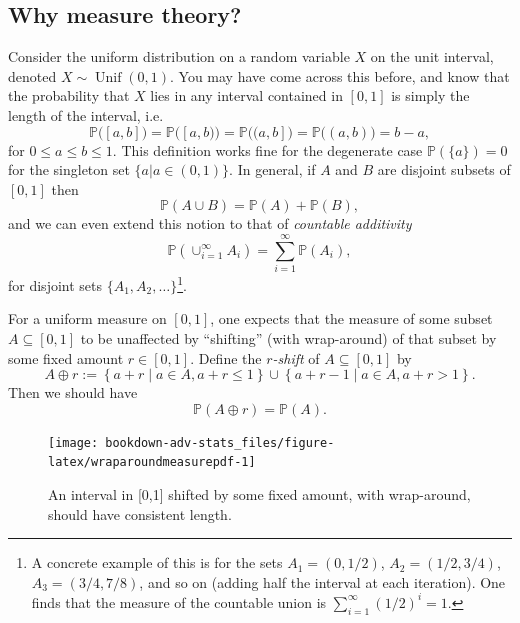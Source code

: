 \documentclass[
]{book}
\DeclareMathOperator{\Unif}{Unif}
\newcommand{\bbP}{\mathbb{P}}
\theoremstyle{definition}
\theoremstyle{definition}
\theoremstyle{definition}
\theoremstyle{definition}
\theoremstyle{remark}
\begin{document}
\hypertarget{why-measure-theory}{%
\subsection{Why measure theory?}\label{why-measure-theory}}

Consider the uniform distribution on a random variable \(X\) on the unit interval, denoted \(X\sim\Unif(0,1)\). You may have come across this before, and know that the probability that \(X\) lies in any interval contained in \([0,1]\) is simply the length of the interval, i.e.
\begin{equation}
\bbP\big([a,b]\big) = \bbP\big([a,b)\big) = \bbP\big((a,b]\big) = \bbP\big((a,b)\big) = b-a, \label{eq:meas1}
\end{equation}
for \(0 \leq a \leq b \leq 1\). This definition works fine for the degenerate case \(\bbP(\{a\})=0\) for the singleton set \(\{a|a\in(0,1)\}\).
In general, if \(A\) and \(B\) are disjoint subsets of \([0,1]\) then
\begin{equation}
\bbP(A \cup B) = \bbP(A) + \bbP(B),
\end{equation}
and we can even extend this notion to that of \emph{countable additivity}
\begin{equation}
\bbP\left( \cup_{i=1}^\infty A_i \right) = \sum_{i=1}^\infty \bbP(A_i), \label{eq:meas2}
\end{equation}
for disjoint sets \(\{A_1,A_2,\dots\}\)\footnote{A concrete example of this is for the sets \(A_1=(0,1/2)\), \(A_2=(1/2, 3/4)\), \(A_3=(3/4,7/8)\), and so on (adding half the interval at each iteration). One finds that the measure of the countable union is \(\sum_{i=1}^\infty (1/2)^i=1\).}.

For a uniform measure on \([0,1]\), one expects that the measure of some subset \(A \subseteq [0,1]\) to be unaffected by ``shifting'' (with wrap-around) of that subset by some fixed amount \(r\in[0,1]\).
Define the \emph{\(r\)-shift} of \(A\subseteq [0,1]\) by
\[
A \oplus r := \left\{ a + r \mid a \in A, a+r \leq 1 \right\} \cup \left\{ a + r - 1 \mid a \in A, a+r > 1 \right\}.
\]
Then we should have
\begin{equation}
\bbP(A \oplus r) = \bbP(A). \label{eq:meas3}
\end{equation}

\begin{figure}

{\centering \texttt{[image: bookdown-adv-stats\_files/figure-latex/wraparoundmeasurepdf-1]} 

}

\caption{An interval in [0,1] shifted by some fixed amount, with wrap-around, should have consistent length.}\label{fig:wraparoundmeasurepdf}
\end{figure}
\end{document}
